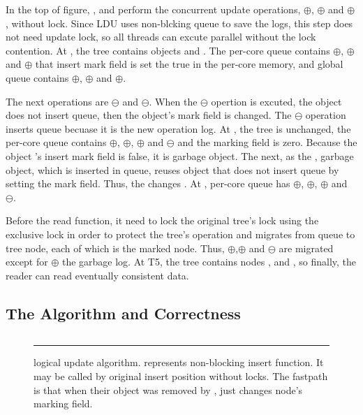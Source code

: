 In the top of figure, ,  and  perform the
concurrent update operations, $\oplus$, $\oplus$ and
$\oplus$, without lock.
Since LDU uses non-blcking queue to save the logs, this step does not need
update lock, so all threads can excute parallel without the lock contention.
At , the tree contains objects  and . 
The per-core queue contains $\oplus$, $\oplus$ and
$\oplus$ that insert mark field is set the true in the per-core
memory, and global queue contains $\oplus$, $\oplus$ and
$\oplus$.

The next operations are $\ominus$ and $\ominus$.
When the $\ominus$ opertion is excuted, the object does not insert
queue, then the object's mark field is changed. 
The $\ominus$ operation inserts queue becuase it is the new operation
log.
At , the tree is unchanged, the per-core queue
contains $\oplus$, $\oplus$, $\oplus$ and
$\ominus$ and the marking field is zero.
Because the object 's insert mark field is false, it is garbage
object.
The next, as the , garbage object, which is inserted in queue, reuses
object that does not insert queue by setting the mark field.
Thus, the  changes .
At , per-core queue has $\oplus$, $\oplus$,
$\oplus$ and $\ominus$.

Before the read function, it need to lock the original tree's lock using the
exclusive lock in order to protect the tree's operation and migrates from queue
to tree node, each of which is the marked node.
Thus, $\oplus$,$\oplus$ and $\ominus$ are
migrated except for $\oplus$ the garbage log.
At T5, the tree contains nodes  ,  and
, so finally, the reader can read eventually consistent data.


\subsection{The Algorithm and Correctness}

\begin{figure}[tb]
\begin{center}
\inputminted[linenos,fontsize=\footnotesize, tabsize=2]{c}{src/ldu_logical.c}
\end{center}
\rule{\columnwidth}{0.5pt}
\vspace{-\baselineskip}
\caption{ logical update algorithm.  represents
 non-blocking insert function.
It may be called by original insert position without locks. The fastpath is
 that when their object was removed by ,
  just changes node's marking field.}
\label{fig:gldulogicalupdate}
\end{figure}


